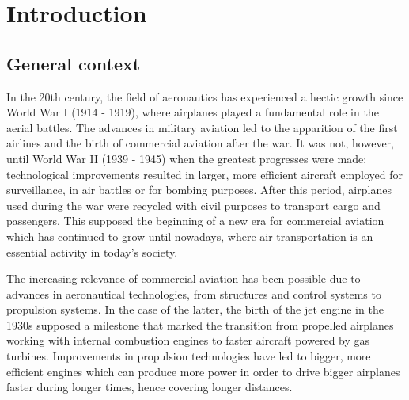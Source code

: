 \chapter{Introduction}

    

\section{General context}





In the 20th century, the field of aeronautics has experienced a hectic growth since World War I (1914 - 1919), where airplanes played a fundamental role in the aerial battles. The advances in military aviation led to the apparition of the first airlines and the birth of commercial aviation after the war. It was not, however, until World War II (1939 - 1945) when the greatest progresses were made: technological improvements resulted in larger, more efficient aircraft employed for surveillance, in air battles or for bombing purposes. After this period, airplanes used during the war were recycled with civil purposes to transport cargo and passengers. This supposed the beginning of a new era for commercial aviation which has continued to grow until nowadays, where air transportation is an essential activity in today's society.

The increasing relevance of commercial aviation has been possible due to advances in aeronautical technologies, from structures and control systems to propulsion systems. In the case of the latter, the birth of the jet engine in the 1930s supposed a milestone that marked the transition from propelled airplanes working with internal combustion engines to faster aircraft powered by gas turbines. Improvements in propulsion technologies have led to bigger, more efficient engines which can produce more power in order to drive bigger airplanes faster during longer times, hence covering longer distances. 

